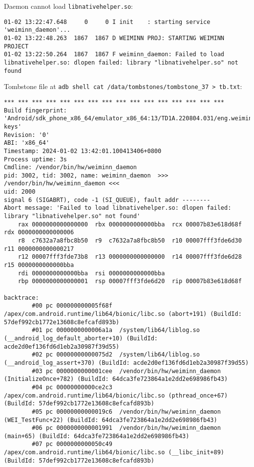Daemon cannot load \texttt{libnativehelper.so}:
\begin{lstlisting}
01-02 13:22:47.648     0     0 I init    : starting service 'weiminn_daemon'...
01-02 13:22:48.263  1867  1867 D WEIMINN PROJ: STARTING WEIMINN PROJECT
01-02 13:22:50.264  1867  1867 F weiminn_daemon: Failed to load libnativehelper.so: dlopen failed: library "libnativehelper.so" not found
\end{lstlisting}
Tombstone file at \texttt{adb shell cat /data/tombstones/tombstone\_37 > tb.txt}:
\begin{lstlisting}
*** *** *** *** *** *** *** *** *** *** *** *** *** *** *** ***
Build fingerprint: 'Android/sdk_phone_x86_64/emulator_x86_64:13/TD1A.220804.031/eng.weimin.20231119.002237:userdebug/test-keys'
Revision: '0'
ABI: 'x86_64'
Timestamp: 2024-01-02 13:42:01.100413406+0800
Process uptime: 3s
Cmdline: /vendor/bin/hw/weiminn_daemon
pid: 3002, tid: 3002, name: weiminn_daemon  >>> /vendor/bin/hw/weiminn_daemon <<<
uid: 2000
signal 6 (SIGABRT), code -1 (SI_QUEUE), fault addr --------
Abort message: 'Failed to load libnativehelper.so: dlopen failed: library "libnativehelper.so" not found'
    rax 0000000000000000  rbx 0000000000000bba  rcx 00007b83e618d68f  rdx 0000000000000006
    r8  c7632a7a8fbc8b50  r9  c7632a7a8fbc8b50  r10 00007fff3fde6d30  r11 0000000000000217
    r12 00007fff3fde73b8  r13 0000000000000000  r14 00007fff3fde6d28  r15 0000000000000bba
    rdi 0000000000000bba  rsi 0000000000000bba
    rbp 0000000000000001  rsp 00007fff3fde6d20  rip 00007b83e618d68f

backtrace:
        #00 pc 000000000005f68f  /apex/com.android.runtime/lib64/bionic/libc.so (abort+191) (BuildId: 57def992cb1772e13608c8efcafd893b)
        #01 pc 0000000000006a1a  /system/lib64/liblog.so (__android_log_default_aborter+10) (BuildId: acde2d0ef136fd6d1eb2a30987f39d55)
        #02 pc 00000000000075d2  /system/lib64/liblog.so (__android_log_assert+370) (BuildId: acde2d0ef136fd6d1eb2a30987f39d55)
        #03 pc 0000000000001cee  /vendor/bin/hw/weiminn_daemon (InitializeOnce+782) (BuildId: 64dca3fe723864a1e2dd2e698986fb43)
        #04 pc 00000000000ce2c3  /apex/com.android.runtime/lib64/bionic/libc.so (pthread_once+67) (BuildId: 57def992cb1772e13608c8efcafd893b)
        #05 pc 00000000000019c6  /vendor/bin/hw/weiminn_daemon (WEI_TestFunc+22) (BuildId: 64dca3fe723864a1e2dd2e698986fb43)
        #06 pc 0000000000001991  /vendor/bin/hw/weiminn_daemon (main+65) (BuildId: 64dca3fe723864a1e2dd2e698986fb43)
        #07 pc 0000000000050c49  /apex/com.android.runtime/lib64/bionic/libc.so (__libc_init+89) (BuildId: 57def992cb1772e13608c8efcafd893b)


\end{lstlisting}
